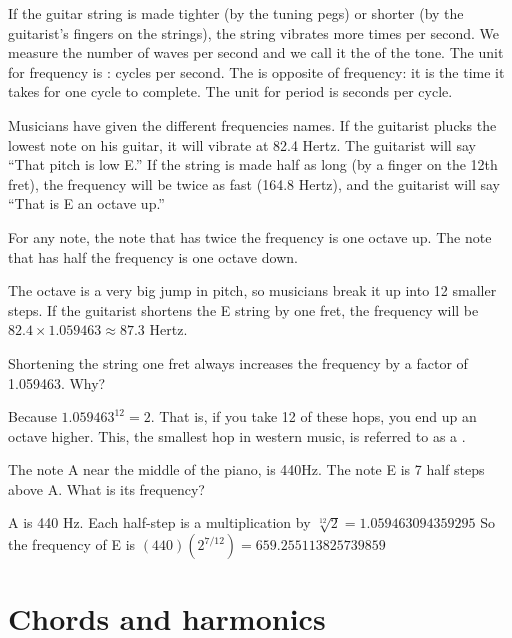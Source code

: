 If the guitar string is made tighter (by the tuning pegs) or shorter
(by the guitarist's fingers on the strings), the string vibrates more
times per second.  We measure the number of waves per second and we
call it the  of the tone. The unit for frequency is
: cycles per second. The  is opposite of frequency:
it is the time it takes for one cycle to complete. The unit for period is seconds per cycle.

Musicians have given the different frequencies names. If the guitarist
plucks the lowest note on his guitar, it will vibrate at 82.4
Hertz. The guitarist will say ``That pitch is low E.'' If the string is made
half as long (by a finger on the 12th fret), the frequency will be
twice as fast (164.8 Hertz), and the guitarist will say ``That is E an
octave up.''

For any note, the note that has twice the frequency is one octave
up. The note that has half the frequency is one octave down.

The octave is a very big jump in pitch, so musicians break it up into
12 smaller steps. If the guitarist shortens the E string by one fret,
the frequency will be $82.4 \times 1.059463 \approx 87.3$ Hertz. 

Shortening the string one fret always increases the frequency by a factor of 1.059463. Why?

Because $1.059463^12 = 2$. That is, if you take 12 of these hops, you
end up an octave higher.
This, the smallest hop in western music, is referred to as a .

\begin{Exercise}[title={Notes and frequencies}, label=note_to_frequency]

The note A near the middle of the piano, is 440Hz. The note E is 7 half steps above A.  What is its frequency?
 
\end{Exercise}
\begin{Answer}[ref=note_to_frequency]

  A is 440 Hz.  Each half-step is a multiplication by $\sqrt[12]{2} = 1.059463094359295$
  So the frequency of E is $(440)(2^{7/12}) = 659.255113825739859$

\end{Answer}


\section{Chords and harmonics}

